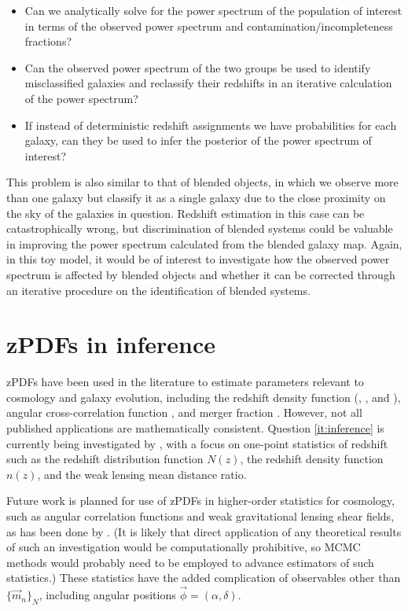 \documentclass[12pt, onecolumn]{emulateapj}
\begin{document}
\begin{itemize}
\item Can we analytically solve for the power spectrum of the population of interest in terms of the observed power spectrum and contamination/incompleteness fractions?
\item Can the observed power spectrum of the two groups be used to identify misclassified galaxies and reclassify their redshifts in an iterative calculation of the power spectrum?
\item If instead of deterministic redshift assignments we have probabilities for each galaxy, can they be used to infer the posterior of the power spectrum of interest?
\end{itemize}

This problem is also similar to that of blended objects, in which we observe more than one galaxy but classify it as a single galaxy due to the close proximity on the sky of the galaxies in question.  Redshift estimation in this case can be catastrophically wrong, but discrimination of blended systems could be valuable in improving the power spectrum calculated from the blended galaxy map.  Again, in this toy model, it would be of interest to investigate how the observed power spectrum is affected by blended objects and whether it can be corrected through an iterative procedure on the identification of blended systems.

\section{zPDFs in inference}

zPDFs have been used in the literature to estimate parameters relevant to cosmology and galaxy evolution, including the redshift density function (\citet{she11}, \citet{bon13}, and \citet{vii15}), angular cross-correlation function \citep{mye09}, and merger fraction \citep{lop14}.  However, not all published applications are mathematically consistent.   Question \ref{it:inference} is currently being investigated by \citet{mal16}, with a focus on one-point statistics of redshift such as the redshift distribution function $N(z)$, the redshift density function $n(z)$, and the weak lensing mean distance ratio.

Future work is planned for use of zPDFs in higher-order statistics for cosmology, such as angular correlation functions and weak gravitational lensing shear fields, as has been done by \citet{man07}.  (It is likely that direct application of any theoretical results of such an investigation would be computationally prohibitive, so MCMC methods would probably need to be employed to advance estimators of such statistics.)  These statistics have the added complication of observables other than $\{\vec{m}_{n}\}_{N}$, including angular positions $\vec{\phi}=(\alpha,\delta)$.  
\end{document}
